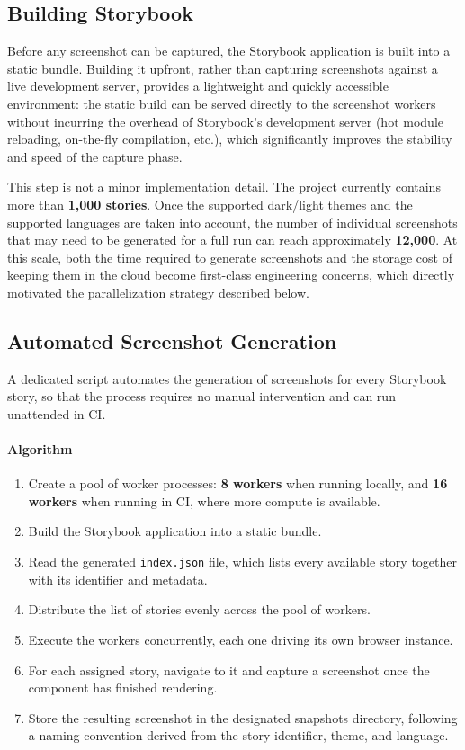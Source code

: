 \subsection{Building Storybook}

Before any screenshot can be captured, the Storybook application is built into a static bundle. Building it upfront, rather than capturing screenshots against a live development server, provides a lightweight and quickly accessible environment: the static build can be served directly to the screenshot workers without incurring the overhead of Storybook's development server (hot module reloading, on-the-fly compilation, etc.), which significantly improves the stability and speed of the capture phase.

This step is not a minor implementation detail. The project currently contains more than \textbf{1,000 stories}. Once the supported dark/light themes and the supported languages are taken into account, the number of individual screenshots that may need to be generated for a full run can reach approximately \textbf{12,000}. At this scale, both the time required to generate screenshots and the storage cost of keeping them in the cloud become first-class engineering concerns, which directly motivated the parallelization strategy described below.

\subsection{Automated Screenshot Generation}

A dedicated script automates the generation of screenshots for every Storybook story, so that the process requires no manual intervention and can run unattended in \ac{CI}.

\paragraph{Algorithm}

\begin{enumerate}
    \item Create a pool of worker processes: \textbf{8 workers} when running locally, and \textbf{16 workers} when running in \ac{CI}, where more compute is available.
    \item Build the Storybook application into a static bundle.
    \item Read the generated \texttt{index.json} file, which lists every available story together with its identifier and metadata.
    \item Distribute the list of stories evenly across the pool of workers.
    \item Execute the workers concurrently, each one driving its own browser instance.
    \item For each assigned story, navigate to it and capture a screenshot once the component has finished rendering.
    \item Store the resulting screenshot in the designated snapshots directory, following a naming convention derived from the story identifier, theme, and language.
\end{enumerate}

